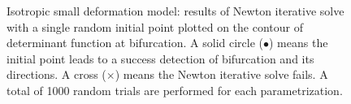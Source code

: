 \documentclass[12pt]{article}
\numberwithin{equation}{section}
\begin{document}
\begin{figure}[H]
   \centering {}   
   \caption{Isotropic small deformation model: results of Newton 
   iterative solve with a single random initial point plotted on the 
   contour of determinant function at bifurcation. A solid circle 
   ($\bullet$) means the initial point leads to a success detection of 
   bifurcation and its directions. A cross ($\times$) means the Newton 
   iterative solve fails. A total of 1000 random trials are performed 
   for each parametrization.}
   \label{fig:iso_shear_robust}
\end{figure}
\end{document}
